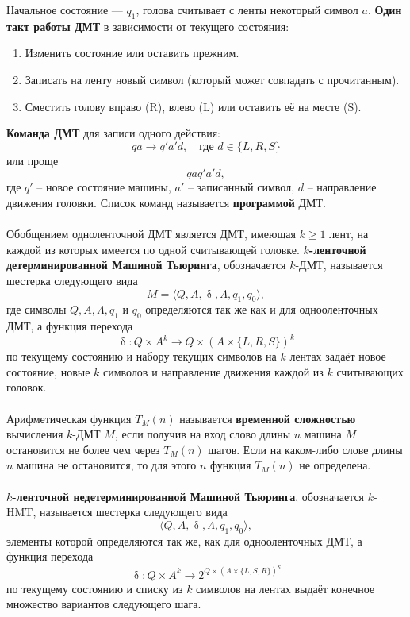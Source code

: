 \documentclass[a4paper, 12pt]{report}
\numberwithin{equation}{section}
\renewcommand{\geq}{\geqslant}
\renewcommand{\delta}{\updelta}
\begin{document}
	Начальное состояние --- $q_1$, голова считывает с ленты некоторый символ $a$.
	\textbf{Один такт работы ДМТ} в зависимости от текущего состояния:
	\begin{enumerate}
		\item Изменить состояние или оставить прежним.
		\item Записать на ленту новый символ (который может совпадать с прочитанным).
		\item Сместить голову вправо (R), влево (L) или оставить её на месте (S).
	\end{enumerate}
	\textbf{Команда ДМТ} для записи одного действия:
	\[
	qa \rightarrow q'a'd, \quad \text{где } d \in \{L, R, S\}
	\]
	или проще
	\[
	qaq'a'd,
	\]
	где $q'$ -- новое состояние машины, $a'$ -- записанный символ, $d$ -- направление движения головки.
	Список команд называется \textbf{программой} ДМТ.
	\\\\
	Обобщением одноленточной ДМТ является ДМТ, имеющая $k\geq 1$ лент, на каждой из которых имеется по одной считывающей головке. \textbf{\( k \)-ленточной детерминированной Машиной Тьюринга}, обозначается \( k \)-ДМТ, называется шестерка следующего вида
	\[
	M = \langle Q, A, \delta, \Lambda, q_1, q_0 \rangle,
	\]
	где символы \( Q, A, \Lambda, q_1 \) и \( q_0 \) определяются так же как и для однооленточных ДМТ, а функция перехода
	\[
	\delta : Q \times A^k \rightarrow Q \times (A \times \{L, R, S\})^k
	\]
	по текущему состоянию и набору текущих символов на \( k \) лентах задаёт новое состояние, новые \( k \) символов и направление движения каждой из \( k \) считывающих головок.
	\\\\
	Арифметическая функция  $T_M(n)$ называется \textbf{временной сложностью} вычисления $k$-ДМТ $M$, если получив на вход слово длины $n$ машина $M$ остановится не более чем через $T_M(n)$ шагов. Если на каком-либо слове длины $n$ машина не остановится, то для этого $n$ функция $T_M(n)$ не определена.
	\\\\
	\textbf{\(k\)-ленточной недетерминированной Машиной Тьюринга}, обозначается \(k\)-HMT, называется шестерка следующего вида
	\[
	\langle Q, A, \delta, \Lambda, q_1, q_0 \rangle,
	\]
	элементы которой определяются так же, как для однооленточных ДМТ, а функция перехода
	\[
	\delta : Q \times A^k \to 2^{Q \times (A \times \{L, S, R\})^k}
	\]
	по текущему состоянию и списку из \(k\) символов на лентах выдаёт конечное множество вариантов следующего шага.
	\\\\
\end{document}
